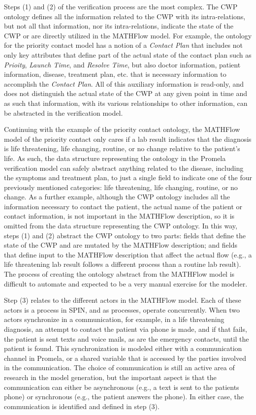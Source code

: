 Steps (1) and (2) of the verification process are the most
complex. The CWP ontology defines all the information related to the
CWP with its intra-relations, but not all that information, nor its
intra-relations, indicate the state of the CWP or are directly
utilized in the MATHFlow model. For example, the ontology for the
priority contact model has a notion of a \emph{Contact Plan} that
includes not only key attributes that define part of the actual state of the contact plan such as
\emph{Prioity}, \emph{Launch Time}, and \emph{Resolve Time}, but also
doctor information, patient information, disease, treatment plan,
etc. that is necessary information to accomplish the \emph{Contact
  Plan}. All of this auxiliary information is read-only, and does not
distinguish the actual state of the CWP at any given point in time and
as such that information, with its various relationships to other
information, can be abstracted in the verification model.

Continuing with the example of the priority contact ontology, the
MATHFlow model of the priority contact only cares if a lab result
indicates that the diagnosis is life threatening, life changing,
routine, or no change relative to the patient's life. As such, the
data structure representing the ontology in the Promela verification
model can safely abstract anything related to the disease, including
the symptoms and treatment plan, to just a single field to indicate
one of the four previously mentioned categories: life threatening,
life changing, routine, or no change.  As a further example, although
the CWP ontology includes all the information necessary to contact the
patient, the actual name of the patient or contact information, is not
important in the MATHFlow description, so it is omitted from the data
structure representing the CWP ontology. In this way, steps (1) and
(2) abstract the CWP ontology to two parts: fields that define the
state of the CWP and are mutated by the MATHFlow description; and
fields that define input to the MATHFlow description that affect the
actual flow (e.g., a life threatening lab result follows a different
process than a routine lab result). The process of creating the
ontology abstract from the MATHFlow model is difficult to automate and
expected to be a very manual exercise for the modeler.

Step (3) relates to the different actors in the MATHFlow
model. Each of these actors is a process in SPIN, and as processes,
operate concurrently. When two actors synchronize in a communication,
for example, in a life threatening diagnosis, an attempt to contact
the patient via phone is made, and if that fails, the patient is sent
texts and voice mails, as are the emergency contacts, until the
patient is found. This synchronization is modeled either with a
communication channel in Promela, or a shared variable that is
accessed by the parties involved in the communication. The choice of
communication is still an active area of research in the model
generation, but the important aspect is that the communication can
either be asynchronous (e.g., a text is sent to the patients phone) or
synchronous (e.g., the patient answers the phone). In either case, the
communication is identified and defined in step (3).

